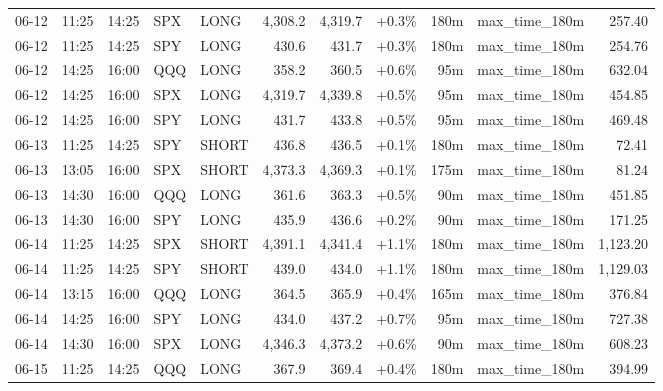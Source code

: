 \documentclass[11pt,a4paper,twoside]{article}
\begin{document}
\begin{center}
\begin{longtable}{>{\color{txtmain}}l l l l l r r r r >{\color{txtmain}}l r}
06-12 & 11:25 & 14:25 & SPX & LONG & 4,308.2 & 4,319.7 & \textcolor{wingreen}{+0.3\%} & 180m & max\_time\_180m & \textcolor{wingreen}{257.40} \\
06-12 & 11:25 & 14:25 & SPY & LONG & 430.6 & 431.7 & \textcolor{wingreen}{+0.3\%} & 180m & max\_time\_180m & \textcolor{wingreen}{254.76} \\
06-12 & 14:25 & 16:00 & QQQ & LONG & 358.2 & 360.5 & \textcolor{wingreen}{+0.6\%} & 95m & max\_time\_180m & \textcolor{wingreen}{632.04} \\
06-12 & 14:25 & 16:00 & SPX & LONG & 4,319.7 & 4,339.8 & \textcolor{wingreen}{+0.5\%} & 95m & max\_time\_180m & \textcolor{wingreen}{454.85} \\
06-12 & 14:25 & 16:00 & SPY & LONG & 431.7 & 433.8 & \textcolor{wingreen}{+0.5\%} & 95m & max\_time\_180m & \textcolor{wingreen}{469.48} \\
06-13 & 11:25 & 14:25 & SPY & SHORT & 436.8 & 436.5 & \textcolor{wingreen}{+0.1\%} & 180m & max\_time\_180m & \textcolor{wingreen}{72.41} \\
06-13 & 13:05 & 16:00 & SPX & SHORT & 4,373.3 & 4,369.3 & \textcolor{wingreen}{+0.1\%} & 175m & max\_time\_180m & \textcolor{wingreen}{81.24} \\
06-13 & 14:30 & 16:00 & QQQ & LONG & 361.6 & 363.3 & \textcolor{wingreen}{+0.5\%} & 90m & max\_time\_180m & \textcolor{wingreen}{451.85} \\
06-13 & 14:30 & 16:00 & SPY & LONG & 435.9 & 436.6 & \textcolor{wingreen}{+0.2\%} & 90m & max\_time\_180m & \textcolor{wingreen}{171.25} \\
06-14 & 11:25 & 14:25 & SPX & SHORT & 4,391.1 & 4,341.4 & \textcolor{wingreen}{+1.1\%} & 180m & max\_time\_180m & \textcolor{wingreen}{1,123.20} \\
06-14 & 11:25 & 14:25 & SPY & SHORT & 439.0 & 434.0 & \textcolor{wingreen}{+1.1\%} & 180m & max\_time\_180m & \textcolor{wingreen}{1,129.03} \\
06-14 & 13:15 & 16:00 & QQQ & LONG & 364.5 & 365.9 & \textcolor{wingreen}{+0.4\%} & 165m & max\_time\_180m & \textcolor{wingreen}{376.84} \\
06-14 & 14:25 & 16:00 & SPY & LONG & 434.0 & 437.2 & \textcolor{wingreen}{+0.7\%} & 95m & max\_time\_180m & \textcolor{wingreen}{727.38} \\
06-14 & 14:30 & 16:00 & SPX & LONG & 4,346.3 & 4,373.2 & \textcolor{wingreen}{+0.6\%} & 90m & max\_time\_180m & \textcolor{wingreen}{608.23} \\
06-15 & 11:25 & 14:25 & QQQ & LONG & 367.9 & 369.4 & \textcolor{wingreen}{+0.4\%} & 180m & max\_time\_180m & \textcolor{wingreen}{394.99} \\

\end{longtable}
\end{center}
\end{document}
